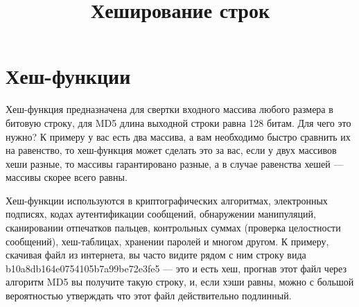 \documentclass[a4paper, 12pt, oneside]{scrartcl}
\title{Хеширование строк}
\author{}
\date{}
\begin{document}
	\maketitle
	\section{Хеш-функции}\label{sec:section1}
	Хеш-функция предназначена для свертки входного массива любого размера в битовую строку, для MD5 длина выходной строки равна 128 битам. Для чего это нужно?
	К примеру у вас есть два массива, а вам необходимо быстро сравнить их на равенство, то хеш-функция может сделать это за вас, если у двух массивов хеши разные, то массивы гарантировано разные, а в случае равенства хешей — массивы скорее всего равны.
	~\cite{hash}
	
	Хеш-функции используются в криптографических алгоритмах, электронных подписях, кодах аутентификации сообщений, обнаружении манипуляций, сканировании отпечатков пальцев, контрольных суммах (проверка целостности сообщений), хеш-таблицах, хранении паролей и многом другом. К примеру, скачивая файл из интернета, вы часто видите рядом с ним строку вида b10a8db164e0754105b7a99be72e3fe5 — это и есть хеш, прогнав этот файл через алгоритм MD5 вы получите такую строку, и, если хэши равны, можно с большой вероятностью утверждать что этот файл действительно подлинный.

	\par
\end{document}
